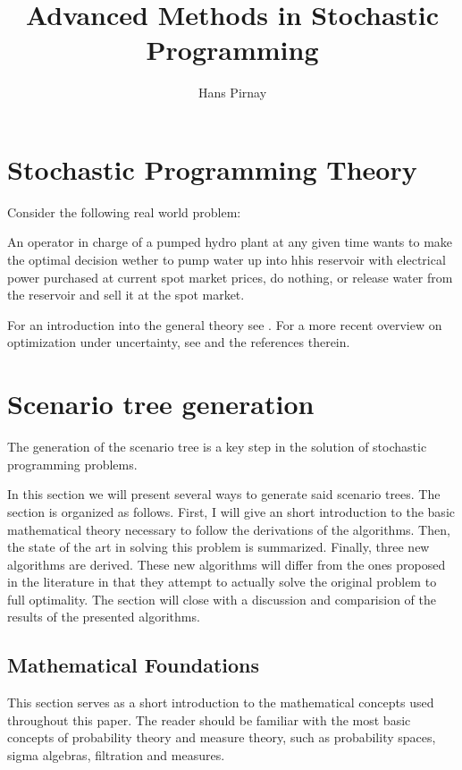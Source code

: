 \documentclass[a4paper, 12pt] {article}
\begin{document}
\title{Advanced Methods in Stochastic Programming}
\author{Hans Pirnay}
\maketitle
\tableofcontents
\newpage
\section{Stochastic Programming Theory}
Consider the following real world problem:

An operator in charge of a pumped hydro plant at any given time wants to make the optimal decision wether to pump water up into hhis reservoir with electrical power purchased at current spot market prices, do nothing, or release water from the reservoir and sell it at the spot market. 

For an introduction into the general theory see \cite{Birge1997}. For a more recent overview on optimization under uncertainty, see \cite{Sahinidis2004} and the references therein.
\section{Scenario tree generation}
The generation of the scenario tree is a key step in the solution of stochastic programming problems.

In this section we will present several ways to generate said scenario trees. The section is organized as follows. First, I will give an short introduction to the basic mathematical theory necessary to follow the derivations of the algorithms. Then, the state of the art in solving this problem is summarized. Finally, three new algorithms are derived. These new algorithms will differ from the ones proposed in the literature in that they attempt to actually solve the original problem to full optimality. The section will close with a discussion and comparision of the results of the presented algorithms. 
\subsection{Mathematical Foundations}
This section serves as a short introduction to the mathematical concepts used throughout this paper. The reader should be familiar with the most basic concepts of probability theory and measure theory, such as probability spaces, sigma algebras, filtration and measures.
\end{document}
